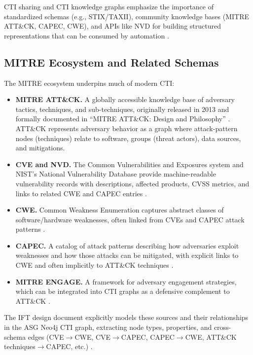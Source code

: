 \documentclass[unnumsec,webpdf,contemporary,large]{oup-authoring-template}
\theoremstyle{thmstyleone}
\theoremstyle{thmstyletwo}
\theoremstyle{thmstylethree}
\begin{document}
CTI sharing and CTI knowledge graphs emphasize the importance of standardized schemas (e.g., STIX/TAXII), community knowledge bases (MITRE ATT\&CK, CAPEC, CWE), and APIs like NVD for building structured representations that can be consumed by automation \cite{strom2018mitreattck,mitreCVE,mitreCWE,mitreCAPEC}.

\subsection{MITRE Ecosystem and Related Schemas}

The MITRE ecosystem underpins much of modern CTI:

\begin{itemize}
  \item \textbf{MITRE ATT\&CK.} A globally accessible knowledge base of adversary tactics, techniques, and sub-techniques, originally released in 2013 and formally documented in ``MITRE ATT\&CK: Design and Philosophy'' \cite{strom2018mitreattck}. ATT\&CK represents adversary behavior as a graph where attack-pattern nodes (techniques) relate to software, groups (threat actors), data sources, and mitigations.
  \item \textbf{CVE and NVD.} The Common Vulnerabilities and Exposures system and NIST's National Vulnerability Database provide machine-readable vulnerability records with descriptions, affected products, CVSS metrics, and links to related CWE and CAPEC entries \cite{mitreCVE}.
  \item \textbf{CWE.} Common Weakness Enumeration captures abstract classes of software/hardware weaknesses, often linked from CVEs and CAPEC attack patterns \cite{mitreCWE}.
  \item \textbf{CAPEC.} A catalog of attack patterns describing how adversaries exploit weaknesses and how those attacks can be mitigated, with explicit links to CWE and often implicitly to ATT\&CK techniques \cite{mitreCAPEC}.
  \item \textbf{MITRE ENGAGE.} A framework for adversary engagement strategies, which can be integrated into CTI graphs as a defensive complement to ATT\&CK \cite{cardei2025ift}.
\end{itemize}

The IFT design document explicitly models these sources and their relationships in the ASG Neo4j CTI graph, extracting node types, properties, and cross-schema edges (CVE$\rightarrow$CWE, CVE$\rightarrow$CAPEC, CAPEC$\rightarrow$CWE, ATT\&CK techniques$\rightarrow$CAPEC, etc.) \cite{cardei2025ift}.
\end{document}
